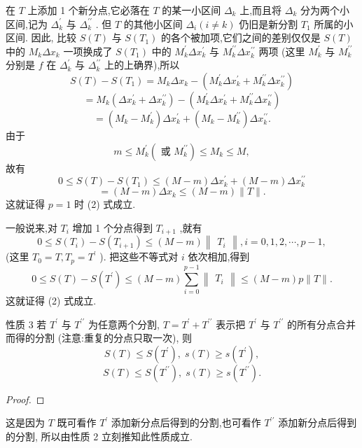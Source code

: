 在 \(T\) 上添加 1 个新分点,它必落在 \(T\) 的某一小区间 \({\Delta }_{k}\) 上,而且将 \({\Delta }_{k}\) 分为两个小区间,记为 \({\Delta }_{k}^{\prime }\) 与 \({\Delta }_{k}^{\prime \prime }\) . 但 \(T\) 的其他小区间 \({\Delta }_{i}\left( {i \neq  k}\right)\) 仍旧是新分割 \({T}_{1}\) 所属的小区间. 因此, 比较 \(S\left( T\right)\) 与 \(S\left( {T}_{1}\right)\) 的各个被加项,它们之间的差别仅仅是 \(S\left( T\right)\) 中的 \({M}_{k}\Delta {x}_{k}\) 一项换成了 \(S\left( {T}_{1}\right)\) 中的 \({M}_{k}^{\prime }\Delta {x}_{k}^{\prime }\) 与 \({M}_{k}^{\prime \prime }\Delta {x}_{k}^{\prime \prime }\) 两项 (这里 \({M}_{k}^{\prime }\) 与 \({M}_{k}^{\prime \prime }\) 分别是 \(f\) 在 \({\Delta }_{k}^{\prime }\) 与 \({\Delta }_{k}^{\prime \prime }\) 上的上确界),所以
\[
S\left( T\right)  - S\left( {T}_{1}\right)  = {M}_{k}\Delta {x}_{k} - \left( {{M}_{k}^{\prime }\Delta {x}_{k}^{\prime } + {M}_{k}^{\prime \prime }\Delta {x}_{k}^{\prime \prime }}\right)
\]
\[
= {M}_{k}\left( {\Delta {x}_{k}^{\prime } + \Delta {x}_{k}^{\prime \prime }}\right)  - \left( {{M}_{k}^{\prime }\Delta {x}_{k}^{\prime } + {M}_{k}^{\prime \prime }\Delta {x}_{k}^{\prime \prime }}\right)
\]
\[
= \left( {{M}_{k} - {M}_{k}^{\prime }}\right) \Delta {x}_{k}^{\prime } + \left( {{M}_{k} - {M}_{k}^{\prime \prime }}\right) \Delta {x}_{k}^{\prime \prime }.
\]
由于
\[
m \leq  {M}_{k}^{\prime }\left( {\text{ 或 }{M}_{k}^{\prime \prime }}\right)  \leq  {M}_{k} \leq  M,
\]
故有
\[
0 \leq  S\left( T\right)  - S\left( {T}_{1}\right)  \leq  \left( {M - m}\right) \Delta {x}_{k}^{\prime } + \left( {M - m}\right) \Delta {x}_{k}^{\prime \prime }
\]
\[
= \left( {M - m}\right) \Delta {x}_{k} \leq  \left( {M - m}\right) \parallel T\parallel .
\]
这就证得 \(p = 1\) 时 (2) 式成立.

一般说来,对 \({T}_{i}\) 增加 1 个分点得到 \({T}_{i + 1}\) ,就有
\[
0 \leq  S\left( {T}_{i}\right)  - S\left( {T}_{i + 1}\right)  \leq  \left( {M - m}\right) \begin{Vmatrix}{T}_{i}\end{Vmatrix},i = 0,1,2,\cdots ,p - 1,
\]
(这里 \({T}_{0} = T,{T}_{p} = {T}^{\prime }\) ). 把这些不等式对 \(i\) 依次相加,得到
\[
0 \leq  S\left( T\right)  - S\left( {T}^{\prime }\right)  \leq  \left( {M - m}\right) \mathop{\sum }\limits_{{i = 0}}^{{p - 1}}\begin{Vmatrix}{T}_{i}\end{Vmatrix} \leq  \left( {M - m}\right) p\parallel T\parallel .
\]
这就证得 (2) 式成立.

性质 3 若 \({T}^{\prime }\) 与 \({T}^{\prime \prime }\) 为任意两个分割, \(T = {T}^{\prime } + {T}^{\prime \prime }\) 表示把 \({T}^{\prime }\) 与 \({T}^{\prime \prime }\) 的所有分点合并而得的分割 (注意:重复的分点只取一次), 则
\[
S\left( T\right)  \leq  S\left( {T}^{\prime }\right) ,\;s\left( T\right)  \geq  s\left( {T}^{\prime }\right) ,
\]
\[
S\left( T\right)  \leq  S\left( {T}^{\prime \prime }\right) ,\;s\left( T\right)  \geq  s\left( {T}^{\prime \prime }\right) .
\]
\begin{proof}

\end{proof}
这是因为 \(T\) 既可看作 \({T}^{\prime }\) 添加新分点后得到的分割,也可看作 \({T}^{\prime \prime }\) 添加新分点后得到的分割, 所以由性质 2 立刻推知此性质成立.

